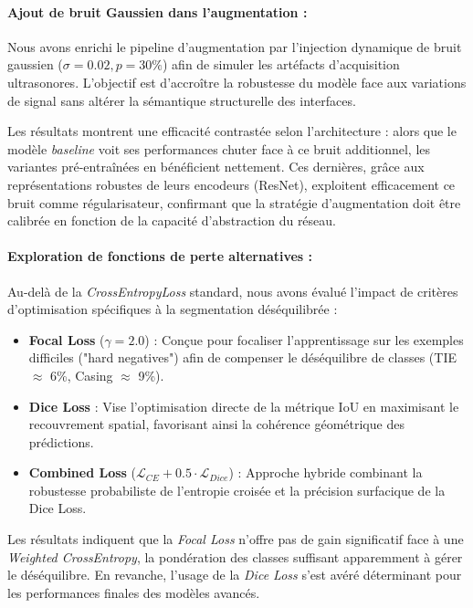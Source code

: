 \paragraph{Ajout de bruit Gaussien dans l'augmentation :}

Nous avons enrichi le pipeline d'augmentation par l'injection dynamique de bruit gaussien ($\sigma=0.02, p=30\%$) afin de simuler les artéfacts d'acquisition ultrasonores. L'objectif est d'accroître la robustesse du modèle face aux variations de signal sans altérer la sémantique structurelle des interfaces.

Les résultats montrent une efficacité contrastée selon l'architecture : alors que le modèle \textit{baseline} voit ses performances chuter face à ce bruit additionnel, les variantes pré-entraînées en bénéficient nettement. Ces dernières, grâce aux représentations robustes de leurs encodeurs (ResNet), exploitent efficacement ce bruit comme régularisateur, confirmant que la stratégie d'augmentation doit être calibrée en fonction de la capacité d'abstraction du réseau.

\paragraph{Exploration de fonctions de perte alternatives :}

Au-delà de la \textit{CrossEntropyLoss} standard, nous avons évalué l'impact de critères d'optimisation spécifiques à la segmentation déséquilibrée :
\begin{itemize}
      \item \textbf{Focal Loss} ($\gamma=2.0$) : Conçue pour focaliser l'apprentissage sur les exemples difficiles ("hard negatives") afin de compenser le déséquilibre de classes (TIE $\approx$ 6\%, Casing $\approx$ 9\%).
      \item \textbf{Dice Loss} : Vise l'optimisation directe de la métrique IoU en maximisant le recouvrement spatial, favorisant ainsi la cohérence géométrique des prédictions.
      \item \textbf{Combined Loss} ($\mathcal{L}_{CE} + 0.5 \cdot \mathcal{L}_{Dice}$) : Approche hybride combinant la robustesse probabiliste de l'entropie croisée et la précision surfacique de la Dice Loss.
\end{itemize}

Les résultats indiquent que la \textit{Focal Loss} n'offre pas de gain significatif face à une \textit{Weighted CrossEntropy}, la pondération des classes suffisant apparemment à gérer le déséquilibre. En revanche, l'usage de la \textit{Dice Loss} s'est avéré déterminant pour les performances finales des modèles avancés.
